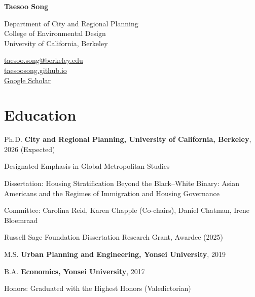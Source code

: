 \documentclass[11pt,letterpaper]{report}
\newcommand{\myname}{Taesoo Song}
\newcommand{\namefont}[1]{{\normalfont\bfseries\Huge{#1}}}
\newcommand{\listitemspace}{0.4em}
\renewenvironment{itemize}
{\begin{list}{}{\setlength{\leftmargin}{0.5em}
\setlength{\parskip}{0em}
\setlength{\itemsep}{\listitemspace}
\setlength{\parsep}{\listitemspace}}}
{\end{list}}
\begin{document}
\raggedright{}

\namefont{\myname}

\vspace{1em}
\begin{minipage}[t]{0.695\textwidth}
Department of City and Regional Planning\\
College of Environmental Design\\
University of California, Berkeley
\end{minipage}
\begin{minipage}[t]{0.300\textwidth}
\flushright{}
\href{mailto:taesoo.song@berkeley.edu}{taesoo.song@berkeley.edu} \\
\href{https://taesoosong.github.io}{taesoosong.github.io}\\
\href{https://scholar.google.com/citations?user=xM5Rc-EAAAAJ&hl=en}{Google Scholar}\\
\end{minipage}

\section*{Education}

\begin{tablist}
\item[Ph.D.] \tab{}\textbf{City and Regional Planning, University of California, Berkeley}, 2026 (Expected)
\item \tab{}Designated Emphasis in Global Metropolitan Studies
\begin{itemize}
\item Dissertation: Housing Stratification Beyond the Black–White Binary: Asian Americans and the Regimes of Immigration and Housing Governance
\vspace{-0.6em}
\item {Committee: Carolina Reid, Karen Chapple (Co-chairs), Daniel Chatman, Irene Bloemraad}
\vspace{-0.6em}
\item Russell Sage Foundation Dissertation Research Grant, Awardee (2025)
\end{itemize}
\item[M.S.] \tab{}\textbf{Urban Planning and Engineering, Yonsei University}, 2019
\item[B.A.] \tab{}\textbf{Economics, Yonsei University}, 2017
\begin{itemize}
\item Honors: Graduated with the Highest Honors (Valedictorian)
\end{itemize}
\end{tablist}
\end{document}
